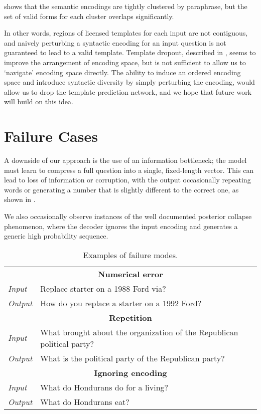 \documentclass[11pt,a4paper]{article}
\begin{document}
 shows that the semantic encodings  are tightly clustered by paraphrase, but the set of valid forms for each cluster overlaps significantly.  

In other words, regions of licensed templates for each input are not contiguous, and naively perturbing a syntactic encoding for an input question is not guaranteed to lead to a valid template. Template dropout, described in , seems to improve the arrangement of encoding space, but is not sufficient to allow us to `navigate' encoding space directly. The ability to induce an ordered encoding space and introduce syntactic diversity by simply perturbing the encoding, would allow us to drop the template prediction network, and we hope that future work will build on this idea.

\section{Failure Cases}
\label{sec:failure}

A downside of our approach is the use of an information bottleneck; the model must learn to compress a full question into a single, fixed-length vector. This can lead to loss of information or corruption, with the output occasionally repeating words or generating a number that is slightly different to the correct one, as shown in .



We also occasionally observe instances of the well documented posterior collapse phenomenon, where the decoder ignores the input encoding and generates a generic high probability sequence.


\begin{table}[t!]
    \small
    \centering
    \begin{tabular}{lp{6cm}} \hline \hline
\multicolumn{2}{c}{\textbf{Numerical error}} \\
\emph{Input} & Replace starter on a 1988 Ford via? \\
\emph{Output} & How do you replace a starter on a 1992 Ford? \\
        \hline\hline
 \multicolumn{2}{c}{\textbf{Repetition}} \\
 \emph{Input} & What brought about the organization of the Republican
 political party? \\
\emph{Output} & What is the political party of the Republican party? \\
        \hline\hline
 \multicolumn{2}{c}{\textbf{Ignoring encoding}} \\
\emph{Input}& What do Hondurans do for a living?\\
\emph{Output}& What do Hondurans eat?\\ \hline \hline
    \end{tabular}
    \caption{Examples of failure modes.}
    \label{tab:errors}
\end{table}
\end{document}
